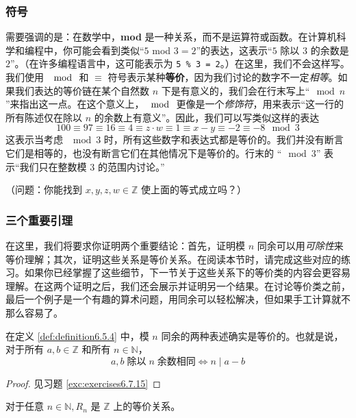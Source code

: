 \subsubsection*{符号}

需要强调的是：在数学中，\textbf{mod} 是一种关系，而不是运算符或函数。在计算机科学和编程中，你可能会看到类似``$5$ mod $3 = 2$''的表达，这表示``$5$ 除以 $3$ 的余数是 $2$''。（在许多编程语言中，这可能表示为 \verb|5 % 3 = 2|。）在这里，我们不会这样写。我们使用 $\mod$ 和 $\equiv$ 符号表示某种\textbf{等价}，因为我们讨论的数字不一定\emph{相等}。如果我们表达的等价链在某个自然数 $n$ 下是有意义的，我们会在行末写上``$\mod n$''来指出这一点。在这个意义上，$\mod$ 更像是一个\emph{修饰符}，用来表示``这一行的所有陈述仅在除以 $n$ 的余数上有意义''。因此，我们可以写类似这样的表达
\[100 \equiv 97 \equiv 16 \equiv 4 \equiv z \cdot w \equiv 1 \equiv x - y \equiv -2 \equiv -8 \mod 3\]
这表示当考虑 $\mod 3$ 时，所有这些数字和表达式都是等价的。我们并没有断言它们是相等的，也没有断言它们在其他情况下是等价的。行末的 ``$\mod 3$'' 表示``我们只在整数模 $3$ 的范围内讨论。''

（问题：你能找到 $x, y, z, w \in \mathbb{Z}$ 使上面的等式成立吗？）

\subsubsection*{三个重要引理}

在这里，我们将要求你证明两个重要结论：首先，证明模 $n$ 同余可以用\emph{可除性}来等价理解；其次，证明这些关系是等价关系。在阅读本节时，请完成这些对应的练习。如果你已经掌握了这些细节，下一节关于这些关系下的等价类的内容会更容易理解。在这两个证明之后，我们还会展示并证明另一个结果。在讨论等价类之前，最后一个例子是一个有趣的算术问题，用同余可以轻松解决，但如果手工计算就不那么容易了。

\begin{lemma}
    在定义 \ref{def:definition6.5.4} 中，模 $n$ 同余的两种表述确实是等价的。也就是说，对于所有 $a, b \in \mathbb{Z}$ 和所有 $n \in \mathbb{N}$，
    \[a, b \;\text{除以}\; n \;\text{余数相同} \iff n \mid a - b\]
\end{lemma}

\begin{proof}
    见习题 \ref{exc:exercises6.7.15}
\end{proof}

\begin{lemma}\label{lemma6.5.9}
    对于任意 $n \in \mathbb{N}, R_n$ 是 $\mathbb{Z}$ 上的等价关系。
\end{lemma}

